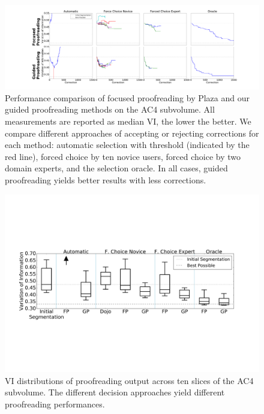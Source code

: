 \begin{figure}[t]
\begin{center}
\includegraphics[width=\linewidth]{gfx/ac4trails.pdf}
\end{center}
  \vspace{-4mm}
   \caption{Performance comparison of focused proofreading by Plaza and our guided proofreading methods on the AC4 subvolume. All measurements are reported as median VI, the lower the better. We compare different approaches of accepting or rejecting corrections for each method: automatic selection with threshold (indicated by the red line), forced choice by ten novice users, forced choice by two domain experts, and the selection oracle. In all cases, guided proofreading yields better results with less corrections.}
\label{fig:ac4trails}
\end{figure}

\begin{figure}[t]
\begin{center}
\includegraphics[width=\linewidth]{gfx/ac4boxplot.pdf}
\end{center}
  \vspace{-4mm}
   \caption{VI distributions of proofreading output across ten slices of the AC4 subvolume. The different decision approaches yield different proofreading performances.}
\label{fig:ac4trails}
\end{figure}

